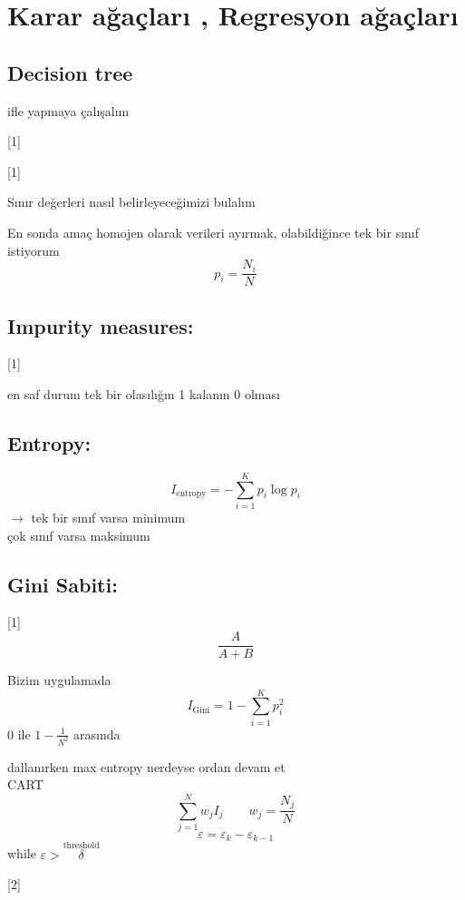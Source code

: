 \documentclass[11pt,a4paper]{article}
\begin{document}

\section{Karar ağaçları , Regresyon ağaçları}
\subsection{Decision tree}
ifle yapmaya çalışalım

[1]

[1]

Sınır değerleri nasıl belirleyeceğimizi bulalım

En sonda amaç homojen olarak verileri ayırmak, olabildiğince tek bir sınıf istiyorum
\[ p_i = \frac{N_i}{N} \]

\subsection{Impurity measures:}
[1]

en saf durum tek bir olasılığın 1 kalanın 0 olması

\subsection{Entropy:}
\[ I_{\mathrm{entropy}} = -\sum_{i=1}^{K} p_i \log p_i \]
$\rightarrow$ tek bir sınıf varsa minimum\\
çok sınıf varsa maksimum

\subsection{Gini Sabiti:}
[1]
\[ \frac{A}{A+B} \]

Bizim uygulamada
\[ I_{\mathrm{Gini}} = 1 - \sum_{i=1}^{K} p_i^2 \]
0 ile $1 - \frac{1}{N^2}$ arasında

dallanırken max entropy nerdeyse ordan devam et\\
CART
\[ \sum_{j=1}^{N} w_j I_j \qquad w_j = \frac{N_j}{N} \]
\[ \varepsilon = \varepsilon_k - \varepsilon_{k-1} \]
while $\varepsilon > \overset{\text{threshold}}{\delta}$

[2]
\end{document}
